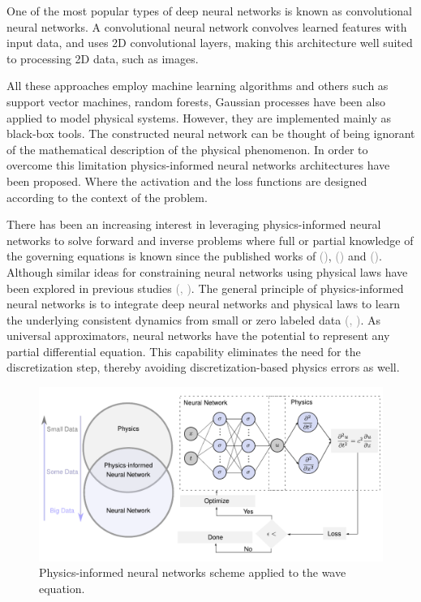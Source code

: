 \documentclass{tufte-handout}
\renewcommand{\citep}[2][]{\textcolor{gray}{(\citeauthor{#2}, \citeyear[#1]{#2})}}
\renewcommand{\citeauthoryear}[2][]{\textcolor{gray}{\citeauthor{#2} (\textcolor{gray}{\citeyear[#1]{#2}})}}
\begin{document}
One of the most popular types of deep neural networks is known as convolutional neural networks. A convolutional neural network convolves learned features with input data, and uses 2D convolutional layers, making this architecture well suited to processing 2D data, such as images.

 All these approaches employ machine learning algorithms and others such as support vector machines, random forests, Gaussian processes have been also applied to model physical systems. However, they are implemented mainly as black-box tools. The constructed neural network can be thought of being ignorant of the mathematical description of the physical phenomenon. In order to overcome this limitation physics-informed neural networks architectures have been proposed. Where the activation and the loss functions are designed according to the context of the problem.

There has been an increasing interest in leveraging physics-informed neural networks to solve forward and inverse problems where full or partial knowledge of the governing equations is known since the published works of \citeauthoryear{raissi_hidden_2018}, \citeauthoryear{raissi_numerical_2018} and \citeauthoryear{Raissi2019}. Although similar ideas for constraining neural networks using physical laws have been explored in previous studies \citep{lagaris_artificial_1998}. The general principle of physics-informed neural networks is to integrate deep neural networks and physical laws to learn the underlying consistent dynamics from small or zero labeled data \citep{karniadakis_physics-informed_2021}. As universal approximators, neural networks have the potential to represent any partial differential equation. This capability eliminates the need for the discretization step, thereby avoiding discretization-based physics errors as well. 


\begin{figure}
    \includegraphics{figs/Escheme_PINN_waves.pdf}
    \caption{Physics-informed neural networks scheme applied to the wave equation.}
    \label{deep_learning_subset_architecture}
\end{figure}
\end{document}

